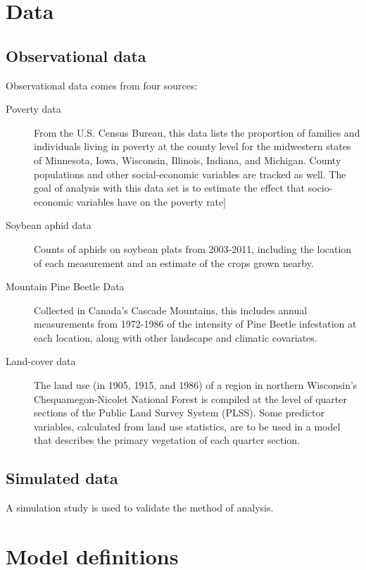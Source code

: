 \documentclass[authoryear ,review]{elsarticle}
\newcommand{\vect}[1]{\boldsymbol{#1}}
\begin{document}
\section{Data}
	\subsection{Observational data}
		Observational data comes from four sources:\\
		
		\begin{description}
			\item[Poverty data] From the U.S. Census Bureau, this data lists the proportion of families and individuals living in poverty at the county level for the midwestern states of Minnesota, Iowa, Wisconsin, Illinois, Indiana, and Michigan. County populations and other social-economic variables are tracked as well. The goal of analysis with this data set is to estimate the effect that socio-economic variables have on the poverty rate]
			\item[Soybean aphid data] Counts of aphids on soybean plats from 2003-2011, including the location of each measurement and an estimate of the crops grown nearby.
			\item[Mountain Pine Beetle Data] Collected in Canada's Cascade Mountains, this includes annual measurements from 1972-1986 of the intensity of Pine Beetle infestation at each location, along with other landscape and climatic covariates.
			\item[Land-cover data] The land use (in 1905, 1915, and 1986) of a region in northern Wisconsin's Chequamegon-Nicolet National Forest is compiled at the level of quarter sections of the Public Land Survey System (PLSS). Some predictor variables, calculated from land use statistics, are to be used in a model that describes the primary vegetation of each quarter section.
		\end{description}
  
	\subsection{Simulated data}
		A simulation study is used to validate the method of analysis.\\
	
\section{Model definitions}
	
\end{document}
